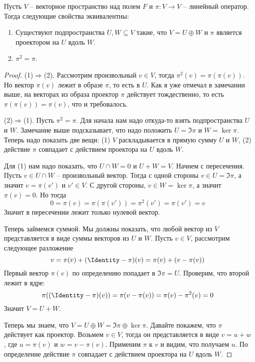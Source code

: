\begin{claim}\label{claim::Projector}
Пусть $V$ -- векторное пространство над полем $F$ и $\pi\colon V\to V$ -- линейный оператор.
Тогда следующие свойства эквивалентны:
\begin{enumerate}
\item Существуют подпространства $U,W\subseteq V$ такие, что $V = U\oplus W$ и $\pi$ является проектором на $U$ вдоль $W$.
\item $\pi^2 = \pi$.
\end{enumerate}
\end{claim}
\begin{proof}
(1)$\Rightarrow$(2).
Рассмотрим произвольный $v\in V$, тогда $\pi^2(v) = \pi(\pi(v))$.
Но вектор $\pi(v)$ лежит в образе $\pi$, то есть в $U$.
Как я уже отмечал в замечании выше, на векторах из образа проектор $\pi$ действует тождественно, то есть $\pi(\pi(v)) = \pi(v)$, что и требовалось.

(2)$\Rightarrow$(1).
Пусть $\pi^2 = \pi$.
Для начала нам  надо откуда-то взять подпространства $U$ и $W$.
Замечание выше подсказывает, что надо положить $U = \Im \pi$ и $W = \ker \pi$.
Теперь надо показать две вещи: (1) $V$ раскладывается в прямую сумму $U$ и $W$, (2) действие $\pi$ совпадает с действием проектора на $U$ вдоль $W$.

Для (1) нам надо показать, что $U\cap W = 0$ и $U + W = V$.
Начнем с пересечения.
Пусть $v\in U\cap W$ -- произвольный вектор.
Тогда с одной стороны $v\in U = \Im \pi$, а значит $v = \pi(v')$ и $v'\in V$.
С другой стороны, $v\in W = \ker \pi$, а значит $\pi(v) = 0$.
Но тогда
\[
0 = \pi(v) = \pi(\pi(v')) = \pi^2(v') = \pi(v') = v
\]
Значит в пересечении лежит только нулевой вектор.

Теперь займемся суммой.
Мы должны показать, что любой вектор из $V$ представляется в виде суммы векторов из $U$ и $W$.
Пусть $v\in V$, рассмотрим следующее разложение
\[
v = \pi (v) + (\Identity - \pi) (v) = \pi(v) + (v - \pi(v))
\]
Первый вектор $\pi(v)$ по определению попадает в $\Im\pi = U$.
Проверим, что второй лежит в ядре:
\[
\pi((\Identity - \pi)(v)) = \pi(v - \pi(v)) = \pi(v) - \pi^2(v) = 0
\]
Значит $V = U + W$.

Теперь мы знаем, что $V = U\oplus W = \Im \pi \oplus \ker \pi$.
Давайте покажем, что $\pi$ действует как проектор.
Возьмем $v\in V$, тогда он представляется в виде $v = u + w$, где $u = \pi(v)$ и $w = v - \pi(v)$.
Применим $\pi$ к $v$ и видим, что получаем $u$.
По определение действие $\pi$ совпадает с действием проектора на $U$ вдоль $W$.
\end{proof}

